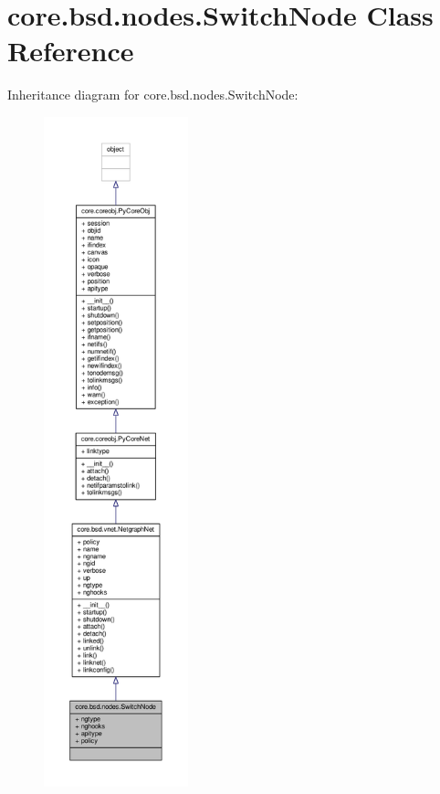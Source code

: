 \hypertarget{classcore_1_1bsd_1_1nodes_1_1_switch_node}{\section{core.\+bsd.\+nodes.\+Switch\+Node Class Reference}
\label{classcore_1_1bsd_1_1nodes_1_1_switch_node}
}


Inheritance diagram for core.\+bsd.\+nodes.\+Switch\+Node\+:
\nopagebreak
\begin{figure}[H]
\begin{center}
\leavevmode
\includegraphics[height=550pt]{classcore_1_1bsd_1_1nodes_1_1_switch_node__inherit__graph}
\end{center}
\end{figure}


